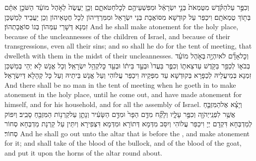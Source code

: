 {וְכִפֶּ֣ר עַל\maqqaf הַקֹּ֗דֶשׁ מִטֻּמְאֹת֙ בְּנֵ֣י יִשְׂרָאֵ֔ל וּמִפִּשְׁעֵיהֶ֖ם לְכׇל\maqqaf חַטֹּאתָ֑ם וְכֵ֤ן יַעֲשֶׂה֙ לְאֹ֣הֶל מוֹעֵ֔ד הַשֹּׁכֵ֣ן אִתָּ֔ם בְּת֖וֹךְ טֻמְאֹתָֽם׃}
{וִיכַפַּר עַל קוּדְשָׁא מִסּוֹאֲבָת בְּנֵי יִשְׂרָאֵל וּמִמִּרְדֵּיהוֹן לְכָל חֲטָאֵיהוֹן וְכֵן יַעֲבֵיד לְמַשְׁכַּן זִמְנָא דְּשָׁרֵי עִמְּהוֹן בְּגוֹ סוֹאֲבָתְהוֹן׃}
{And he shall make atonement for the holy place, because of the uncleannesses of the children of Israel, and because of their transgressions, even all their sins; and so shall he do for the tent of meeting, that dwelleth with them in the midst of their uncleannesses.}{}
{וְכׇל\maqqaf אָדָ֞ם לֹא\maqqaf יִהְיֶ֣ה \legarmeh  בְּאֹ֣הֶל מוֹעֵ֗ד בְּבֹא֛וֹ לְכַפֵּ֥ר בַּקֹּ֖דֶשׁ עַד\maqqaf צֵאת֑וֹ וְכִפֶּ֤ר בַּעֲדוֹ֙ וּבְעַ֣ד בֵּית֔וֹ וּבְעַ֖ד כׇּל\maqqaf קְהַ֥ל יִשְׂרָאֵֽל׃}
{וְכָל אֱנָשׁ לָא יְהֵי בְּמַשְׁכַּן זִמְנָא בְּמֵיעֲלֵיהּ לְכַפָּרָא בְּקוּדְשָׁא עַד מִפְּקֵיהּ וִיכַפַּר עֲלוֹהִי וְעַל אֱנָשׁ בֵּיתֵיהּ וְעַל כָּל קְהָלָא דְּיִשְׂרָאֵל׃}
{And there shall be no man in the tent of meeting when he goeth in to make atonement in the holy place, until he come out, and have made atonement for himself, and for his household, and for all the assembly of Israel.}{}
{וְיָצָ֗א אֶל\maqqaf הַמִּזְבֵּ֛חַ אֲשֶׁ֥ר לִפְנֵֽי\maqqaf יְהֹוָ֖ה וְכִפֶּ֣ר עָלָ֑יו וְלָקַ֞ח מִדַּ֤ם הַפָּר֙ וּמִדַּ֣ם הַשָּׂעִ֔יר וְנָתַ֛ן עַל\maqqaf קַרְנ֥וֹת הַמִּזְבֵּ֖חַ סָבִֽיב׃}
{וְיִפּוֹק לְמַדְבְּחָא דִּקְדָם יְיָ וִיכַפַּר עֲלוֹהִי וְיִסַּב מִדְּמָא דְּתוֹרָא וּמִדְּמָא דִּצְפִירָא וְיִתֵּין עַל קַרְנָת מַדְבְּחָא סְחוֹר סְחוֹר׃}
{And he shall go out unto the altar that is before the \lord, and make atonement for it; and shall take of the blood of the bullock, and of the blood of the goat, and put it upon the horns of the altar round about.}{}
